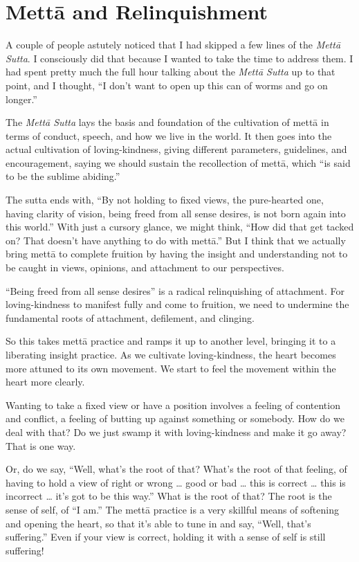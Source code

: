 \chapter{Mettā and Relinquishment}

A couple of people astutely noticed that I had skipped a few lines of
the \emph{Mettā Sutta}. I consciously did that because I wanted to take
the time to address them. I had spent pretty much the full hour talking
about the \emph{Mettā Sutta} up to that point, and I thought, “I don’t
want to open up this can of worms and go on longer.”

The \emph{Mettā Sutta} lays the basis and foundation of the cultivation
of mettā in terms of conduct, speech, and how we live in the world. It
then goes into the actual cultivation of loving-kindness, giving
different parameters, guidelines, and encouragement, saying we should
sustain the recollection of mettā, which “is said to be the sublime
abiding.”

The sutta ends with, “By not holding to fixed views, the pure-hearted
one, having clarity of vision, being freed from all sense desires, is
not born again into this world.” With just a cursory glance, we might
think, “How did that get tacked on? That doesn’t have anything to do
with mettā.” But I think that we actually bring mettā to complete
fruition by having the insight and understanding not to be caught in
views, opinions, and attachment to our perspectives.

“Being freed from all sense desires” is a radical relinquishing of
attachment. For loving-kindness to manifest fully and come to fruition,
we need to undermine the fundamental roots of attachment, defilement,
and clinging.

So this takes mettā practice and ramps it up to another level, bringing
it to a liberating insight practice. As we cultivate loving-kindness,
the heart becomes more attuned to its own movement. We start to feel the
movement within the heart more clearly.

Wanting to take a fixed view or have a position involves a feeling of
contention and conflict, a feeling of butting up against something or
somebody. How do we deal with that? Do we just swamp it with
loving-kindness and make it go away? That is one way.

Or, do we say, “Well, what’s the root of that? What’s the root of that
feeling, of having to hold a view of right or wrong \ldots{} good or bad \ldots{}
this is correct \ldots{} this is incorrect \ldots{} it’s got to be this way.” What
is the root of that? The root is the sense of self, of “I am.” The mettā
practice is a very skillful means of softening and opening the heart, so
that it’s able to tune in and say, “Well, that’s suffering.” Even if
your view is correct, holding it with a sense of self is still
suffering!

